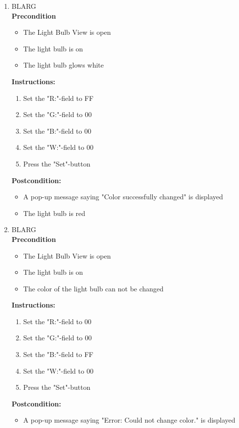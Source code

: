 \documentclass[a4paper]{article}
\newlength{\testlabellength}
\newenvironment{testlist}{\begin{enumerate}[label=\bfseries Instruction \thesubsection.\arabic* , labelindent=0pt, labelwidth=\testlabellength , leftmargin=2cm]}{\end{enumerate}}
\newenvironment{precondition}{
{\color{white}BLARG}\\ 
\textbf{Precondition}
\begin{itemize}[labelindent=0cm, labelwidth=2cm , leftmargin=1cm]
}
{\end{itemize}}
\newenvironment{instruction}{
\textbf{Instructions:}
\begin{enumerate}[label=\bfseries  \arabic*., labelindent=0cm, labelwidth=2cm , leftmargin=1cm]
}
{\end{enumerate}}
\newenvironment{postcondition}{
\textbf{Postcondition:}
\begin{itemize}[labelindent=0cm, labelwidth=2cm , leftmargin=1cm]
}
{\end{itemize}}
\begin{document}
\begin{appendices}
\begin{testlist}

	\item
		\begin{precondition}
			\item The Light Bulb View is open
			\item The light bulb is on
			\item The light bulb glows white
		\end{precondition}
		\begin{instruction}
			\item Set the "R:"-field to FF
			\item Set the "G:"-field to 00
			\item Set the "B:"-field to 00
			\item Set the "W:"-field to 00
			\item Press the "Set"-button
		\end{instruction}
		\begin{postcondition}
			\item A pop-up message saying "Color successfully changed" is displayed
			\item The light bulb is red
		\end{postcondition}

	\item
		\begin{precondition}
			\item The Light Bulb View is open
			\item The light bulb is on
			\item The color of the light bulb can not be changed
		\end{precondition}
		\begin{instruction}
			\item Set the "R:"-field to 00
			\item Set the "G:"-field to 00
			\item Set the "B:"-field to FF
			\item Set the "W:"-field to 00
			\item Press the "Set"-button
		\end{instruction}
		\begin{postcondition}
			\item A pop-up message saying "Error: Could not change color." is displayed
		\end{postcondition}


\end{testlist}
\end{appendices}
\end{document}
